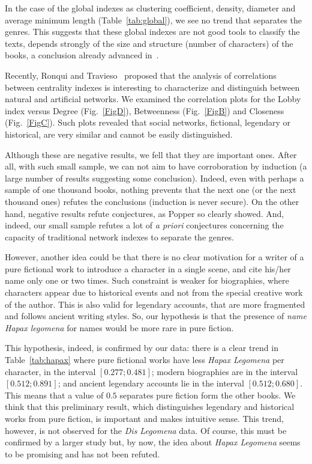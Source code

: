 \documentclass[review]{elsarticle}
\begin{document}
In the case of the global indexes as 
clustering coefficient, density, diameter
and average minimum length (Table~\ref{tab:global}), we see no
trend that separates the genres. This
suggests that these global indexes are not good tools to classify
the texts, depends strongly of the size and structure
(number of characters) of the books, 
a conclusion already advanced
in~\cite{alberich2002,gleiser2007}.

Recently, Ronqui and Travieso~\cite{ronqui2015} 
proposed that the analysis of correlations between 
centrality indexes is interesting to characterize 
and distinguish between natural and artificial networks.
We examined the correlation plots for the Lobby index versus 
Degree (Fig.~\ref{FigD}), Betweenness (Fig.~\ref{FigB}) 
and Closeness (Fig.~\ref{FigC}). Such plots revealed that social
networks, fictional, legendary or historical, 
are very similar and cannot be easily distinguished.

Although these are negative results, we fell that they are
important ones. After all, with such small sample, we
can not aim to have corroboration by induction (a large
number of results suggesting some conclusion).
Indeed, even with perhaps a sample of one thousand books, nothing
prevents that the next one (or the next thousand ones)
refutes the conclusions (induction is never secure).
On the other hand, negative results refute conjectures,
as Popper so clearly showed. And, indeed, our small sample
refutes a lot of \emph{a priori} conjectures concerning the
capacity of traditional network indexes to separate the genres.

However, another idea could be that there is 
no clear motivation for a writer of a pure fictional 
work to introduce a character in a single scene, 
and cite his/her name only one or two times.
Such constraint is weaker for biographies, where characters appear
due to historical events and not from the special creative
work of the author. This is also valid for legendary accounts, 
that are more fragmented and follows ancient writing styles. 
So, our hypothesis is that 
the presence of \emph{name Hapax legomena}  for names would be 
more rare in pure fiction. 

This hypothesis, indeed, is confirmed by our data: there is a clear 
trend in Table~\ref{tab:hapax} where pure fictional works have less
\emph{Hapax Legomena} per character, 
in the interval $[0.277; 0.481]$;
modern biographies are in the interval $[0.512;0.891]$; 
and ancient legendary accounts lie in the interval $[0.512;0.680]$.
This means that a value of $0.5$ separates pure fiction form the
other books. We think that this preliminary result, 
which distinguishes legendary and historical 
works from pure fiction, is important and 
makes intuitive sense. This trend, however, is not 
observed for the \emph{Dis Legomena} data.
Of course, this must be confirmed 
by a larger study but, by now, the idea about 
\emph{Hapax Legomena} seems to be promising and has not been refuted.
\end{document}

